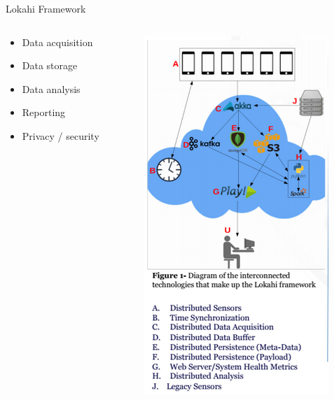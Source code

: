 \documentclass{beamer}
\begin{document}
\begin{frame}{Lokahi Framework}
\begin{columns}
	\begin{column}{.35\textwidth}
		\begin{itemize}
			\item Data acquisition
			\item Data storage
			\item Data analysis
			\item Reporting
			\item Privacy / security
		\end{itemize}
	\end{column}
	\begin{column}{.65\textwidth}
		\begin{figure}
			\includegraphics[height=.95\textheight]{img/lokahi.png}
		\end{figure}
	\end{column}
\end{columns}
\end{frame}
\end{document}
